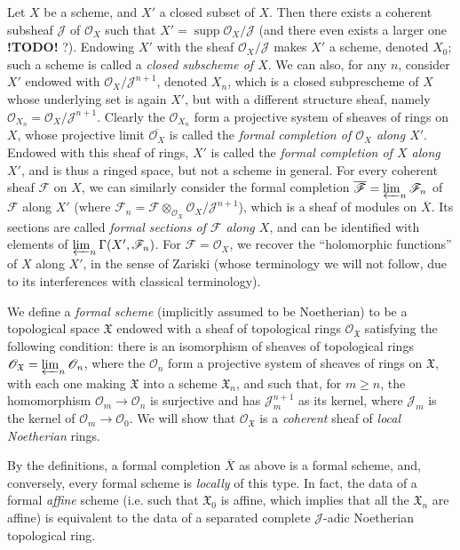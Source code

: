 \documentclass{article}
\theoremstyle{plain}
\newcommand{\sh}{\mathscr}
\newcommand{\fk}{\mathfrak}
\renewcommand{\geq}{\geqslant}
\DeclareMathOperator{\supp}{supp}
\newcommand{\todo}{\textbf{ !TODO! }}
\newcommand{\oldpage}[1]{\marginpar{\footnotesize$\Big\vert$ \textit{p.~#1}}}
\begin{document}
Let $X$ be a scheme, and $X'$ a closed subset of $X$.
Then there exists a coherent subsheaf $\sh{J}$ of $\sh{O}_X$ such that $X'=\supp\sh{O}_X/\sh{J}$ (and there even exists a larger one \todo?).
Endowing $X'$ with the sheaf $\sh{O}_X/\sh{J}$ makes $X'$ a scheme, denoted $X_0$;
such a scheme is called a \emph{closed subscheme of $X$}.
We can also, for any $n$, consider $X'$ endowed with $\sh{O}_X/\sh{J}^{n+1}$, denoted $X_n$, which is a closed subprescheme of $X$ whose underlying set is again $X'$, but with a different structure sheaf, namely $\sh{O}_{X_n}=\sh{O}_X/\sh{J}^{n+1}$.
Clearly the $\sh{O}_{X_n}$ form a projective system of sheaves of rings on $X$, whose projective limit $\overline{\sh{O}_X}$ is called the \emph{formal completion of $\sh{O}_X$ along $X'$}.
Endowed with this sheaf of rings, $X'$ is called the \emph{formal completion of $X$ along $X'$}, and is thus a ringed space, but not a scheme in general.
For every coherent sheaf $\sh{F}$ on $X$, we can similarly consider the formal completion $\overline{\sh{F}}=\varprojlim_n\sh{F}_n$ of $\sh{F}$ along $X'$ (where $\sh{F}_n=\sh{F}\otimes_{\sh{O}_X}\sh{O}_X/\sh{J}^{n+1}$), which is a sheaf of modules on $\overline{X}$.
Its sections are called \emph{formal sections of $\sh{F}$ along $X$}, and can be identified with elements of $\varprojlim_n\Gamma(X',\sh{F}_n)$.
For $\sh{F}=\sh{O}_X$, we recover the ``holomorphic functions'' of $X$ along $X'$, in the sense of Zariski (whose terminology we will not follow, due to its interferences with classical terminology).

We define a \emph{formal scheme} (implicitly assumed to be Noetherian) to be a topological space $\fk{X}$ endowed with a sheaf of topological rings $\sh{O}_{\fk{X}}$ satisfying the following condition:
there is an isomorphism of sheaves of topological rings $\sh{O}_{\fk{X}}=\varprojlim_n\sh{O}_n$, where the $\sh{O}_n$ form a projective system of sheaves of rings on $\fk{X}$, with each one making $\fk{X}$ into a scheme $\fk{X}_n$, and such that, for $m\geq n$, the homomorphism $\sh{O}_m\to\sh{O}_n$ is surjective and has $\sh{J}_m^{n+1}$ as its kernel, where $\sh{J}_m$ is
\oldpage{182-04}
the kernel of $\sh{O}_m\to\sh{O}_0$.
We will show that $\sh{O}_{\fk{X}}$ is a \emph{coherent} sheaf of \emph{local Noetherian} rings.

By the definitions, a formal completion $\overline{X}$ as above is a formal scheme, and, conversely, every formal scheme is \emph{locally} of this type.
In fact, the data of a formal \emph{affine} scheme (i.e. such that $\fk{X}_0$ is affine, which implies that all the $\fk{X}_n$ are affine) is equivalent to the data of a separated complete $\sh{J}$-adic Noetherian topological ring.
\end{document}
